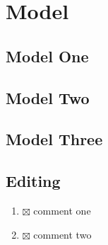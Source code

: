 \section{Model}

\subsection{Model One}


\subsection{Model Two}


\subsection{Model Three}


\subsection{Editing}
\begin{enumerate}
  \item $\boxtimes$ comment one
  \item $\boxtimes$ comment two
\end{enumerate}
